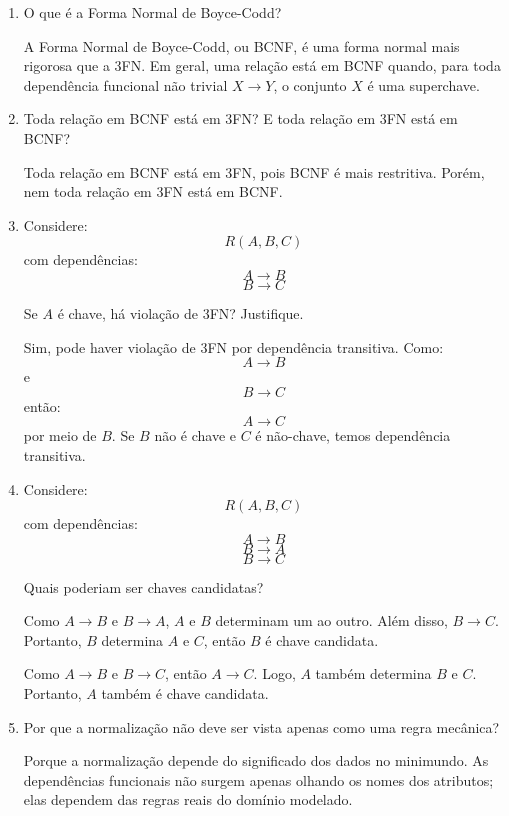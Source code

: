 \documentclass[12pt,a4paper]{article}
\begin{document}
\begin{enumerate}[resume,label=\textbf{Q\arabic*.}]
\item O que é a Forma Normal de Boyce-Codd?

\begin{resposta}
A Forma Normal de Boyce-Codd, ou BCNF, é uma forma normal mais rigorosa que a 3FN. Em geral, uma relação está em BCNF quando, para toda dependência funcional não trivial $X \rightarrow Y$, o conjunto $X$ é uma superchave.
\end{resposta}

\item Toda relação em BCNF está em 3FN? E toda relação em 3FN está em BCNF?

\begin{resposta}
Toda relação em BCNF está em 3FN, pois BCNF é mais restritiva. Porém, nem toda relação em 3FN está em BCNF.
\end{resposta}

\item Considere:
\[
R(A, B, C)
\]
com dependências:
\[
A \rightarrow B
\]
\[
B \rightarrow C
\]

Se $A$ é chave, há violação de 3FN? Justifique.

\begin{resposta}
Sim, pode haver violação de 3FN por dependência transitiva. Como:
\[
A \rightarrow B
\]
e
\[
B \rightarrow C
\]
então:
\[
A \rightarrow C
\]
por meio de $B$. Se $B$ não é chave e $C$ é não-chave, temos dependência transitiva.
\end{resposta}

\item Considere:
\[
R(A, B, C)
\]
com dependências:
\[
A \rightarrow B
\]
\[
B \rightarrow A
\]
\[
B \rightarrow C
\]

Quais poderiam ser chaves candidatas?

\begin{resposta}
Como $A \rightarrow B$ e $B \rightarrow A$, $A$ e $B$ determinam um ao outro. Além disso, $B \rightarrow C$. Portanto, $B$ determina $A$ e $C$, então $B$ é chave candidata.

Como $A \rightarrow B$ e $B \rightarrow C$, então $A \rightarrow C$. Logo, $A$ também determina $B$ e $C$. Portanto, $A$ também é chave candidata.
\end{resposta}

\item Por que a normalização não deve ser vista apenas como uma regra mecânica?

\begin{resposta}
Porque a normalização depende do significado dos dados no minimundo. As dependências funcionais não surgem apenas olhando os nomes dos atributos; elas dependem das regras reais do domínio modelado.
\end{resposta}

\end{enumerate}
\end{document}
